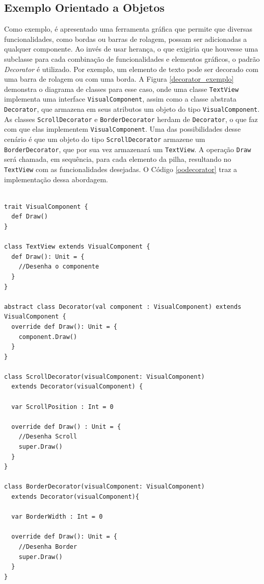\subsection*{Exemplo Orientado a Objetos}

Como exemplo, é apresentado uma ferramenta  
gráfica que permite que diversas funcionalidades, 
como bordas ou barras de rolagem, possam ser adicionadas 
a qualquer componente. Ao invés de usar herança, 
o que exigiria que houvesse uma subclasse para cada 
combinação de funcionalidades e elementos gráficos, 
o padrão \textit{Decorator} é utilizado. Por exemplo, um 
elemento de texto pode ser decorado com uma barra 
de rolagem ou com uma borda. A Figura \ref{decorator_exemplo} 
demonstra o diagrama de classes para esse caso, 
onde uma classe \texttt{TextView} implementa uma interface 
\texttt{VisualComponent}, assim como a classe abstrata \texttt{Decorator}, 
que armazena em seus atributos um objeto do tipo 
\texttt{VisualComponent}. As classes \texttt{ScrollDecorator} e 
\texttt{BorderDecorator} herdam de \texttt{Decorator}, o que faz com que 
elas implementem \texttt{VisualComponent}. Uma das 
possibilidades desse cenário é que um objeto do tipo 
\texttt{ScrollDecorator} armazene um \texttt{BorderDecorator}, que 
por sua vez armazenará um \texttt{TextView}. A operação 
\texttt{Draw} será chamada, em sequência, para cada 
elemento da pilha, resultando no \texttt{TextView} 
com as funcionalidades desejadas. O Código 
\ref{oodecorator} traz a implementação dessa 
abordagem.

\begin{lstlisting}[caption={\textit{Decorator} Orientado a Objetos.},label=oodecorator]

trait VisualComponent {
  def Draw()
}

class TextView extends VisualComponent {
  def Draw(): Unit = {
    //Desenha o componente
  }
}

abstract class Decorator(val component : VisualComponent) extends VisualComponent {
  override def Draw(): Unit = {
    component.Draw()
  }
}

class ScrollDecorator(visualComponent: VisualComponent)
  extends Decorator(visualComponent) {

  var ScrollPosition : Int = 0

  override def Draw() : Unit = {
    //Desenha Scroll
    super.Draw()
  }
}

class BorderDecorator(visualComponent: VisualComponent)
  extends Decorator(visualComponent){

  var BorderWidth : Int = 0

  override def Draw(): Unit = {
    //Desenha Border
    super.Draw()
  }
}

\end{lstlisting}

